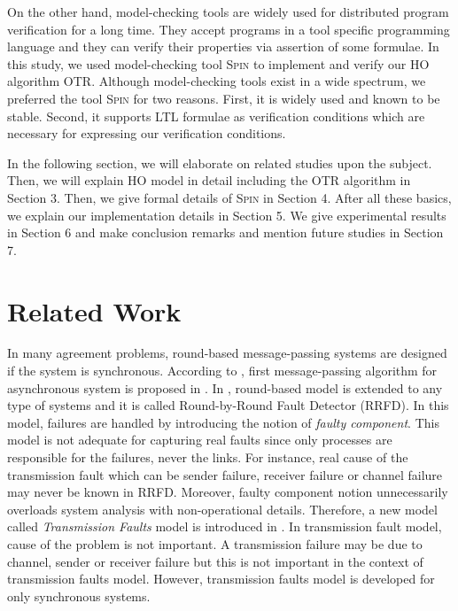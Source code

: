 \documentclass{llncs}
\begin{document}
On the other hand, model-checking tools are widely used for distributed program verification for a long time. They accept programs in a tool specific programming language and they can verify their properties via assertion of some formulae. In this study, we used model-checking tool \textsc{Spin} to implement and verify our HO algorithm OTR. Although model-checking tools exist in a wide spectrum, we preferred the tool \textsc{Spin} for two reasons. First, it is widely used and known to be stable. Second, it supports LTL formulae as verification conditions which are necessary for expressing our verification conditions. 

In the following section, we will elaborate on related studies upon the subject. Then, we will explain HO model in detail including the OTR algorithm in Section 3. Then, we give formal details of \textsc{Spin} in Section 4. After all these basics, we explain our implementation details in Section 5. We give experimental results in Section 6 and make conclusion remarks and mention future studies in Section 7.

\section{Related Work}
In many agreement problems, round-based message-passing systems are designed \cite{dolev90,dolev83,schmid01} if the system is synchronous. According to \cite{charron09}, first message-passing algorithm for asynchronous system is proposed in \cite{dwork88}. In \cite{gafni98}, round-based model is extended to any type of systems and it is called Round-by-Round Fault Detector (RRFD). In this model, failures are handled by introducing the notion of \emph{faulty component}. This model is not adequate for capturing real faults since only processes are responsible for the failures, never the links. For instance, real cause of the transmission fault which can be sender failure, receiver failure or  channel failure may never be known in RRFD. Moreover, faulty component notion unnecessarily overloads system analysis with non-operational details. Therefore, a new model called \emph{Transmission Faults} model is introduced in \cite{santoro07,santoro89}. In transmission fault model, cause of the problem is not important. A transmission failure may be due to channel, sender or receiver failure but this is not important in the context of transmission faults model. However, transmission faults model is developed for only synchronous systems.
\end{document}
